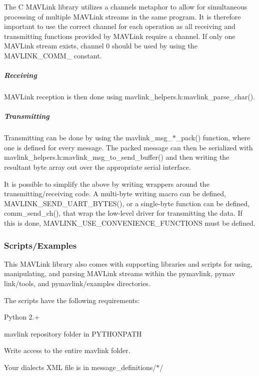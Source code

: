 The C M\+A\+V\+Link library utilizes a channels metaphor to allow for simultaneous processing of multiple M\+A\+V\+Link streams in the same program. It is therefore important to use the correct channel for each operation as all receiving and transmitting functions provided by M\+A\+V\+Link require a channel. If only one M\+A\+V\+Link stream exists, channel 0 should be used by using the {\ttfamily M\+A\+V\+L\+I\+N\+K\+\_\+\+C\+O\+M\+M\+\_} constant.

\subparagraph*{Receiving}

M\+A\+V\+Link reception is then done using {\ttfamily mavlink\+\_\+helpers.\+h\+:mavlink\+\_\+parse\+\_\+char()}.

\subparagraph*{Transmitting}

Transmitting can be done by using the {\ttfamily mavlink\+\_\+msg\+\_\+$\ast$\+\_\+pack()} function, where one is defined for every message. The packed message can then be serialized with {\ttfamily mavlink\+\_\+helpers.\+h\+:mavlink\+\_\+msg\+\_\+to\+\_\+send\+\_\+buffer()} and then writing the resultant byte array out over the appropriate serial interface.

It is possible to simplify the above by writing wrappers around the transmitting/receiving code. A multi-\/byte writing macro can be defined, {\ttfamily M\+A\+V\+L\+I\+N\+K\+\_\+\+S\+E\+N\+D\+\_\+\+U\+A\+R\+T\+\_\+\+B\+Y\+T\+E\+S()}, or a single-\/byte function can be defined, {\ttfamily comm\+\_\+send\+\_\+ch()}, that wrap the low-\/level driver for transmitting the data. If this is done, {\ttfamily M\+A\+V\+L\+I\+N\+K\+\_\+\+U\+S\+E\+\_\+\+C\+O\+N\+V\+E\+N\+I\+E\+N\+C\+E\+\_\+\+F\+U\+N\+C\+T\+I\+O\+NS} must be defined.

\subsubsection*{Scripts/\+Examples}

This M\+A\+V\+Link library also comes with supporting libraries and scripts for using, manipulating, and parsing M\+A\+V\+Link streams within the pymavlink, pymav link/tools, and pymavlink/examples directories.

The scripts have the following requirements\+:
\begin{DoxyItemize}
\item Python 2.+
\item mavlink repository folder in {\ttfamily P\+Y\+T\+H\+O\+N\+P\+A\+TH}
\item Write access to the entire {\ttfamily mavlink} folder.
\item Your dialect\textquotesingle{}s X\+ML file is in {\ttfamily message\+\_\+definitions/$\ast$/}
\end{DoxyItemize}

